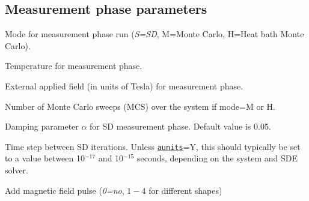 \documentclass[11pt,fleqn,a4]{book} %
\makeatletter
\newcommand{\litem}[1]{\item[\bfseries#1\index{#1@\texttt{#1}}\label{#1}]}
\newcommand{\rkeyword}[1]{\hyperref[#1]{\texttt{#1}}}
\makeatother
\begin{document}
\subsection{Measurement phase parameters}
\begin{description}[leftmargin=!,labelwidth=\widthof{\bfseries fifteenchars}]
\litem{mode} Mode for measurement phase run (\emph{S=SD}, M=Monte Carlo, H=Heat bath Monte Carlo).
\litem{temp} Temperature for measurement phase.
\litem{hfield} External applied field (in units of Tesla) for measurement phase. 
\litem{mcnstep} Number of Monte Carlo sweeps (MCS) over the system if mode=M or H.
\litem{damping}  Damping parameter $\alpha$ for SD measurement phase. Default value is 0.05.
\litem{timestep} Time step between SD iterations. Unless \rkeyword{aunits}=Y, this should typically be set to a value between 10$^{-17}$ and 10$^{-15}$ seconds, depending on the system and SDE solver.
\litem{set_bpulse} Add magnetic field pulse (\emph{0=no}, $1-4$ for different shapes)
\end{description}


\end{document}
